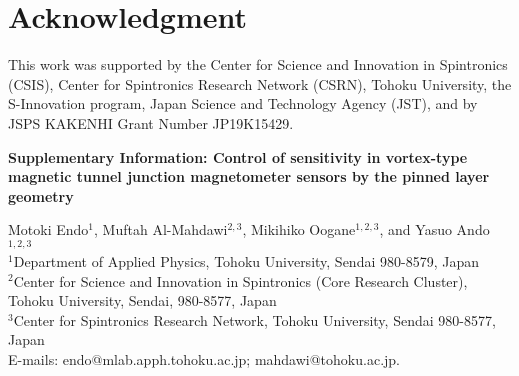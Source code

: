 \documentclass[10pt]{iopart}
\newcommand*{\mytitle}{Control of sensitivity in vortex-type magnetic tunnel junction magnetometer sensors by the pinned layer geometry}
\begin{document}
\section*{Acknowledgment}
    This work was supported by the Center for Science and Innovation in Spintronics (CSIS), Center for Spintronics Research Network (CSRN), Tohoku University, the S-Innovation program, Japan Science and Technology Agency (JST), and by JSPS KAKENHI Grant Number JP19K15429.




\newpage
\clearpage
\onecolumn
\begin{center}
    \textbf{\large Supplementary Information: \mytitle}\par
    \vspace{1em}
    {
    Motoki Endo$^{1}$, 
    Muftah Al-Mahdawi$^{2,3}$, 
    Mikihiko Oogane$^{1,2,3}$, 
    and Yasuo Ando$^{1,2,3}$
    }\\
    {
    $^{1}$Department of Applied Physics, Tohoku University, Sendai 980-8579, Japan \\
    $^{2}$Center for Science and Innovation in Spintronics (Core Research Cluster), Tohoku University, Sendai, 980-8577, Japan \\
    $^{3}$Center for Spintronics Research Network, Tohoku University, Sendai 980-8577, Japan
    }\\
    {
    E-mails: endo@mlab.apph.tohoku.ac.jp; mahdawi@tohoku.ac.jp.
    }

\end{center}\par
\vspace{1em}

\setcounter{section}{0}
\setcounter{equation}{0}
\setcounter{figure}{0}
\setcounter{table}{0}
\setcounter{page}{1}
\makeatletter
\renewcommand{\thesection}{S\arabic{section}}
\renewcommand{\theequation}{S\arabic{equation}}
\renewcommand{\thefigure}{S\arabic{figure}}
\renewcommand{\thepage}{S\arabic{page}}
\renewcommand{\@biblabel}[1]{[SR#1]}
\renewcommand\@cite[1]{[SR#1]}


%
%
\end{document}
